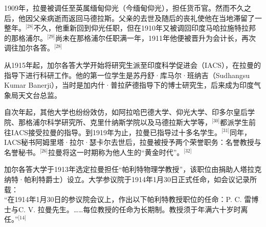 1909年，拉曼被调任至英属缅甸仰光（今缅甸仰光），担任货币官。然而不久之后，他因父亲病逝而返回马德拉斯。父亲的去世及随后的丧礼使他在当地滞留了一整年。\(^\text{[28]}\)不久，他重新回到仰光任职，但在1910年又被调回印度马哈拉施特拉邦的那格浦尔。\(^\text{[29]}\)尚未在那格浦尔任职满一年，1911年他便被晋升为会计长，再次调往加尔各答。\(^\text{[28]}\)

从1915年起，加尔各答大学开始将研究生派至印度科学促进会（IACS），在拉曼的指导下进行科研工作。他的第一位学生是苏丹舒·库马尔·班纳吉（Sudhangsu Kumar Banerji），当时是加内什·普拉萨德指导下的博士研究生，后来成为印度气象局天文台总监。

自次年起，其他大学也纷纷效仿，如阿拉哈巴德大学、仰光大学、印多尔皇后学院、那格浦尔科学研究所、克里什纳斯学院以及马德拉斯大学等，\(^\text{[30]}\)都派学生前往IACS接受拉曼的指导。到1919年为止，拉曼已指导过十多名学生。\(^\text{[31]}\)同年，IACS秘书阿姆里塔·拉尔·瑟卡尔去世后，拉曼被授予两个荣誉职务：名誉教授与名誉秘书。\(^\text{[26]}\)拉曼将这一时期称为他人生的“黄金时代”。\(^\text{[32]}\)

加尔各答大学于1913年选定拉曼担任“帕利特物理学教授”，该职位由捐助人塔拉克纳特·帕利特爵士）设立。大学参议院于1914年1月30日正式任命，如会议记录所载：\\
“在1914年1月30日的参议院会议上，作出以下帕利特教授职位的任命：P. C. 雷博士与C. V. 拉曼先生。……每位教授的任命为长期制。教授须于年满六十岁时离任。”\(^\text{[14]}\)
